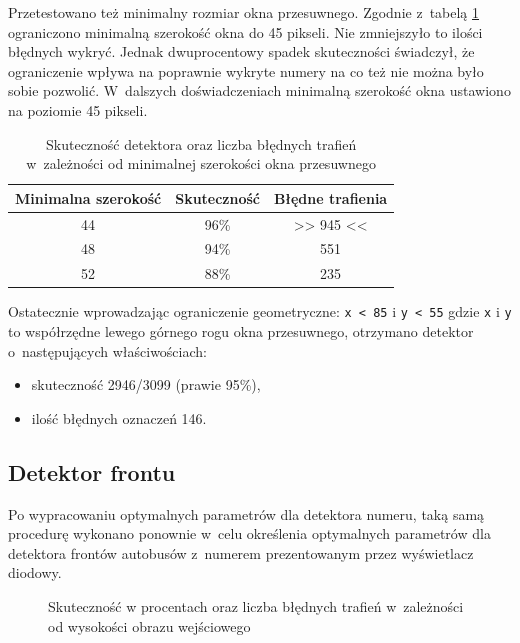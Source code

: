 Przetestowano też minimalny rozmiar okna przesuwnego.
Zgodnie z~tabelą \ref{tab:final_number_detector_minsize} ograniczono 
minimalną szerokość okna do 45 pikseli. 
Nie zmniejszyło to ilości błędnych wykryć.
Jednak dwuprocentowy spadek skuteczności 
świadczył, że ograniczenie wpływa na poprawnie wykryte numery
na co też nie można było sobie pozwolić.
W~dalszych doświadczeniach minimalną szerokość
okna ustawiono na poziomie 45 pikseli.

\begin{table}[!h]
    \centering
    \begin{tabular}{c|c|c}
        Minimalna szerokość & Skuteczność & Błędne trafienia
        \\ \hline
        44 & 96\% & >> 945 << \\
        48 & 94\% & 551 \\
        52 & 88\% & 235 \\
    \end{tabular}
    \caption{Skuteczność detektora oraz liczba błędnych trafień
    w~zależności od minimalnej szerokości okna przesuwnego}
    \label{tab:final_number_detector_minsize}
\end{table}

Ostatecznie wprowadzając ograniczenie geometryczne:
\verb|x < 85| i \verb|y < 55| gdzie \verb|x| i \verb|y| to współrzędne
lewego górnego rogu okna przesuwnego, otrzymano detektor
o~następujących właściwościach:

\begin{itemize}
    \item skuteczność 2946/3099 (prawie 95\%),
    \item ilość błędnych oznaczeń 146.
\end{itemize}

\subsection{Detektor frontu}

Po wypracowaniu optymalnych parametrów dla detektora numeru,
taką samą procedurę wykonano ponownie w~celu określenia
optymalnych parametrów dla detektora frontów autobusów 
z~numerem prezentowanym przez wyświetlacz diodowy.


\begin{figure}[h!]
\begin{center}
\end{center}
\caption{Skuteczność w procentach oraz liczba błędnych trafień
w~zależności od wysokości obrazu wejściowego}
\label{chart:img_height2hitratio}
\end{figure}

